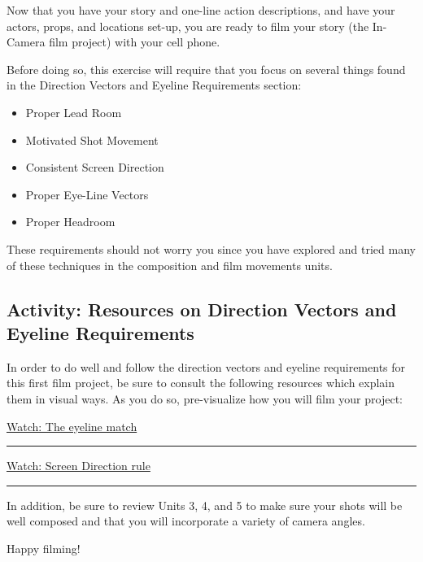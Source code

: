 \documentclass[
]{book}
\providecommand{\tightlist}{%
  \setlength{\itemsep}{0pt}\setlength{\parskip}{0pt}}
\begin{document}
Now that you have your story and one-line action descriptions, and have your actors, props, and locations set-up, you are ready to film your story (the In-Camera film project) with your cell phone.

Before doing so, this exercise will require that you focus on several things found in the Direction Vectors and Eyeline Requirements section:

\begin{itemize}
\tightlist
\item
  Proper Lead Room\\
\item
  Motivated Shot Movement\\
\item
  Consistent Screen Direction\\
\item
  Proper Eye-Line Vectors\\
\item
  Proper Headroom
\end{itemize}

These requirements should not worry you since you have explored and tried many of these techniques in the composition and film movements units.

\hypertarget{activity-resources-on-direction-vectors-and-eyeline-requirements}{%
\subsection*{Activity: Resources on Direction Vectors and Eyeline Requirements}\label{activity-resources-on-direction-vectors-and-eyeline-requirements}}

\begin{reflect}
In order to do well and follow the direction vectors and eyeline requirements for this first film project, be sure to consult the following resources which explain them in visual ways. As you do so, pre-visualize how you will film your project:

\href{https://www.youtube.com/watch?v=y_1H6V7uyYc}{Watch: The eyeline match}

\begin{center}\rule{0.5\linewidth}{0.5pt}\end{center}

\href{https://www.youtube.com/watch?v=9XOn5uxdSJc}{Watch: Screen Direction rule}

\begin{center}\rule{0.5\linewidth}{0.5pt}\end{center}

In addition, be sure to review Units 3, 4, and 5 to make sure your shots will be well composed and that you will incorporate a variety of camera angles.

Happy filming!
\end{reflect}
\end{document}
